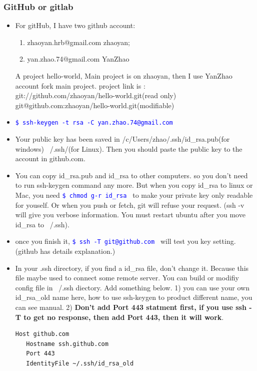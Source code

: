 \documentclass[a4paper,12pt,twoside]{book}
\newcommand{\linuxcommand}[1]{\texttt{\textcolor{blue}{\$ #1 \Pisymbol{psy}{191}}}}
\begin{document}
\subsubsection{GitHub or gitlab}
\begin{itemize}
\item For gitHub, I have two github account:
\begin{enumerate}
  \item zhaoyan.hrb@gmail.com  zhaoyan;
  \item yan.zhao.74@gmail.com YanZhao
\end{enumerate}
A project hello-world, Main project is on zhaoyan, then I use YanZhao account fork main project. project link is : \\
git://github.com/zhaoyan/hello-world.git(read only) \\
git@github.com:zhaoyan/hello-world.git(modifiable)


\item \linuxcommand{ssh-keygen -t rsa -C yan.zhao.74@gmail.com} 

\item Your public key has been saved in /c/Users/zhao/.ssh/id\_rsa.pub(for windows) ~/.ssh/(for Linux). Then you should paste the public key to the account in github.com.  
        	
\item You can copy id\_rsa.pub and id\_rsa to other computers. so you don't need to run ssh-keygen command any more. But when you copy id\_rsa to linux or Mac, you need \linuxcommand{chmod g-r id\_rsa} to make your private key only readable for youself. Or when you push or fetch, git will refuse your request.  (ssh -v will give you verbose information. You must restart ubuntu after you move id\_rsa to ~/.ssh).


\item once you finish it, \linuxcommand{ssh -T git@github.com} will test you key setting. (github has details explanation.)

\item In your .ssh directory, if you find a id\_rsa file, don't change it. Because this file maybe used to connect some remote server. You can build or modifiy config file in ~/.ssh diectory. Add something below. 1) you can use your own id\_rsa\_old name here, how to use ssh-keygen to product different name, you can see manual. 2) \textbf{Don't add Port 443 statment first, if you use ssh -T to get no response, then add Port 443, then it will work}.
\begin{verbatim}
Host github.com
   Hostname ssh.github.com
   Port 443
   IdentityFile ~/.ssh/id_rsa_old
\end{verbatim}


\end{itemize}
\end{document}
